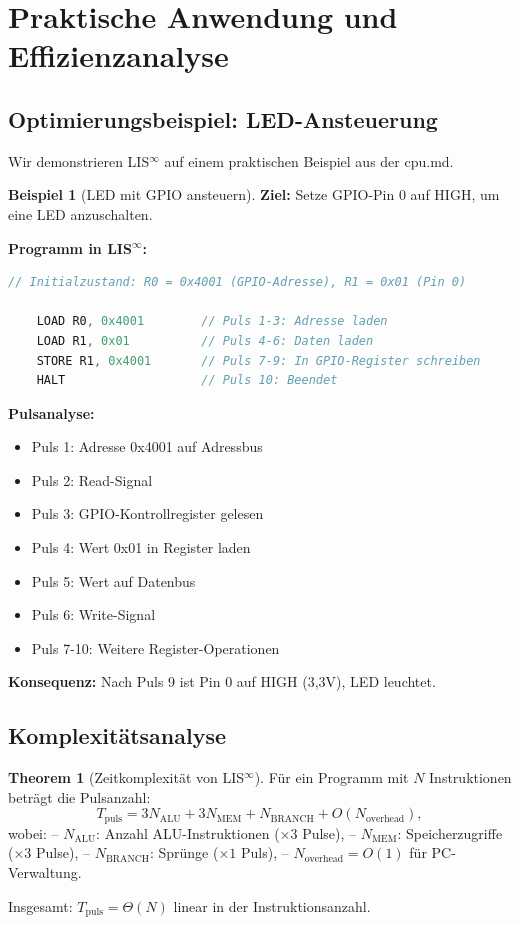\documentclass[a4paper,12pt]{article}
\theoremstyle{definition}
\newtheorem{theorem}{Theorem}
\newtheorem{beispiel}{Beispiel}
\begin{document}
\section{Praktische Anwendung und Effizienzanalyse}
\label{sec:praktische_anwendung}

\subsection{Optimierungsbeispiel: LED-Ansteuerung}

Wir demonstrieren LIS$^{\infty}$ auf einem praktischen Beispiel aus der cpu.md.

\begin{beispiel}[LED mit GPIO ansteuern]
	\label{bsp:led_gpio}
	\textbf{Ziel:} Setze GPIO-Pin 0 auf HIGH, um eine LED anzuschalten.
	
	\textbf{Programm in LIS$^{\infty}$:}
	\begin{lstlisting}[language=C]
	// Initialzustand: R0 = 0x4001 (GPIO-Adresse), R1 = 0x01 (Pin 0)
	
	LOAD R0, 0x4001        // Puls 1-3: Adresse laden
	LOAD R1, 0x01          // Puls 4-6: Daten laden
	STORE R1, 0x4001       // Puls 7-9: In GPIO-Register schreiben
	HALT                   // Puls 10: Beendet
	\end{lstlisting}
	
	\textbf{Pulsanalyse:}
	\begin{itemize}
		\item Puls 1: Adresse 0x4001 auf Adressbus
		\item Puls 2: Read-Signal
		\item Puls 3: GPIO-Kontrollregister gelesen
		\item Puls 4: Wert 0x01 in Register laden
		\item Puls 5: Wert auf Datenbus
		\item Puls 6: Write-Signal
		\item Puls 7-10: Weitere Register-Operationen
	\end{itemize}
	
	\textbf{Konsequenz:} Nach Puls 9 ist Pin 0 auf HIGH (3,3V), LED leuchtet.
\end{beispiel}

\subsection{Komplexitätsanalyse}

\begin{theorem}[Zeitkomplexität von LIS$^{\infty}$]
	\label{thm:complexity}
	Für ein Programm mit $N$ Instruktionen beträgt die Pulsanzahl:
	\[
	T_{\text{puls}} = 3N_{\text{ALU}} + 3N_{\text{MEM}} + N_{\text{BRANCH}} + O(N_{\text{overhead}}),
	\]
	wobei:
	-- $N_{\text{ALU}}$: Anzahl ALU-Instruktionen ($\times 3$ Pulse),
	-- $N_{\text{MEM}}$: Speicherzugriffe ($\times 3$ Pulse),
	-- $N_{\text{BRANCH}}$: Sprünge ($\times 1$ Puls),
	-- $N_{\text{overhead}} = O(1)$ für PC-Verwaltung.
	
	Insgesamt: $T_{\text{puls}} = \Theta(N)$ linear in der Instruktionsanzahl.
\end{theorem}
\end{document}
